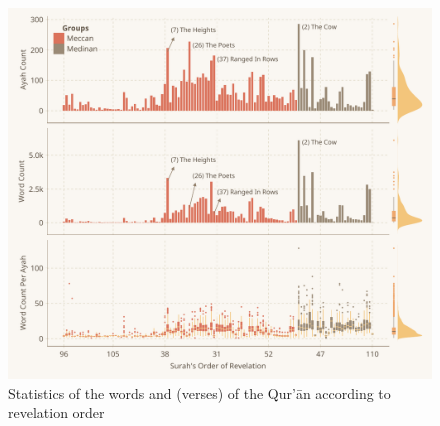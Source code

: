 \begin{figure}[!t]
    \centering
    \includegraphics[width=\textwidth]{img/plot2.pdf}
    \caption{Statistics of the words and   (verses) of the Qur'\=an according to revelation order}
    \label{fig:result_ayah_word_count_rev_order}
\end{figure}

